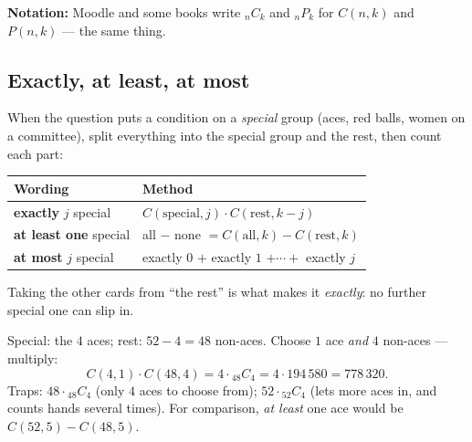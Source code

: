 \documentclass{fkt-notes}
\theoremstyle{definition}
\begin{document}
\noindent \textbf{Notation:} Moodle and some books write ${}_{n}C_{k}$
and ${}_{n}P_{k}$ for
$C(n, k)$ and $P(n, k)$ --- the same thing.

\subsection{Exactly, at least, at most}
%
When the question puts a condition on a \emph{special} group (aces,
red balls, women on a committee), split everything into the special
group and the rest, then count each part:

\begin{rulepar}
  \begin{center}
    \renewcommand{\arraystretch}{1.4}
    \begin{tabular}{@{}ll@{}}
      \toprule
      Wording                       & Method                                                \\
      \midrule
      \textbf{exactly} $j$ special  & $C(\text{special}, j) \cdot C(\text{rest}, k - j)$    \\
      \textbf{at least one} special & all $-$ none $= C(\text{all}, k) - C(\text{rest}, k)$ \\
      \textbf{at most} $j$ special  & exactly $0$ $+$ exactly $1$ $+ \cdots +$ exactly $j$  \\
      \bottomrule
    \end{tabular}
  \end{center}
\end{rulepar}

\noindent Taking the other cards from ``the rest'' is what makes it
\emph{exactly}: no further special one can slip in.

\begin{example}
  Special: the $4$ aces; rest: $52 - 4 = 48$ non-aces. Choose $1$ ace
  \emph{and} $4$ non-aces --- multiply:
  \[
    C(4, 1) \cdot C(48, 4) = 4 \cdot {}_{48}C_4
    = 4 \cdot 194\,580 = 778\,320.
  \]
  Traps: $48 \cdot {}_{48}C_4$ (only $4$ aces to choose from);
  $52 \cdot {}_{52}C_4$ (lets more aces in, and counts hands several
  times). For comparison, \emph{at least} one ace would be
  $C(52, 5) - C(48, 5)$.
\end{example}
\end{document}

